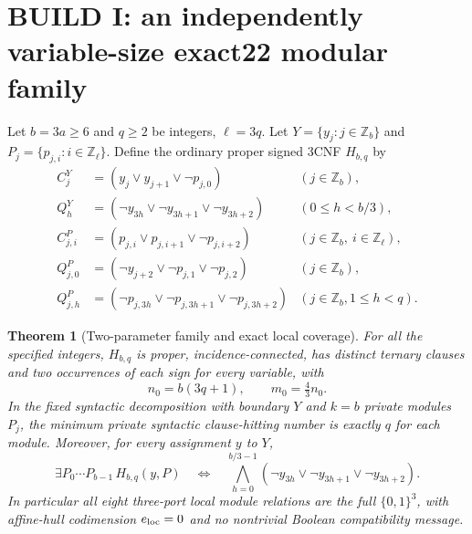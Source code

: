 \documentclass[10pt]{article}
\newtheorem{theorem}{Theorem}
\begin{document}
\section{BUILD I: an independently variable-size exact22 modular family}
\noindent Let $b=3a\ge6$ and $q\ge2$ be integers, $\ell=3q$. Let $Y=\{y_j:j\in\mathbb Z_b\}$ and $P_j=\{p_{j,i}:i\in\mathbb Z_\ell\}$. Define the ordinary proper signed 3CNF $H_{b,q}$ by
\begin{align}
 C_j^Y&=(y_j\vee y_{j+1}\vee\neg p_{j,0}) &(j\in\mathbb Z_b),\\
 Q_h^Y&=(\neg y_{3h}\vee\neg y_{3h+1}\vee\neg y_{3h+2}) &(0\le h<b/3),\\
 C_{j,i}^P&=(p_{j,i}\vee p_{j,i+1}\vee\neg p_{j,i+2}) &(j\in\mathbb Z_b,\ i\in\mathbb Z_\ell),\\
 Q_{j,0}^P&=(\neg y_{j+2}\vee\neg p_{j,1}\vee\neg p_{j,2}) &(j\in\mathbb Z_b),\\
 Q_{j,h}^P&=(\neg p_{j,3h}\vee\neg p_{j,3h+1}\vee\neg p_{j,3h+2}) &(j\in\mathbb Z_b,1\le h<q).
\end{align}
\begin{theorem}[Two-parameter family and exact local coverage]\label{thm:base}
For all the specified integers, $H_{b,q}$ is proper, incidence-connected, has distinct ternary clauses and two occurrences of each sign for every variable, with
\[n_0=b(3q+1),\qquad m_0=\tfrac43n_0.\]
In the fixed syntactic decomposition with boundary $Y$ and $k=b$ private modules $P_j$, the \emph{minimum} private syntactic clause-hitting number is exactly $q$ for each module. Moreover, for every assignment $y$ to $Y$,
\begin{equation}\label{eq:projection}
\exists P_0\cdots P_{b-1}\,H_{b,q}(y,P)
\quad\Longleftrightarrow\quad
\bigwedge_{h=0}^{b/3-1}(\neg y_{3h}\vee\neg y_{3h+1}\vee\neg y_{3h+2}).
\end{equation}
In particular all eight three-port local module relations are the full $\{0,1\}^3$, with affine-hull codimension $e_{\rm loc}=0$ and no nontrivial Boolean compatibility message.
\end{theorem}
\end{document}

